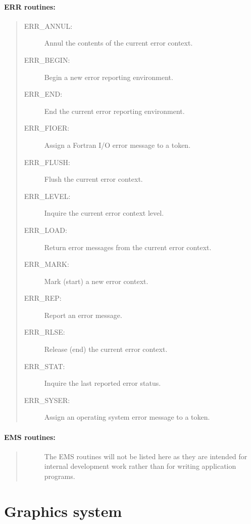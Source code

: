 \paragraph{ERR routines:}

\begin{quote}
\begin{description}
\item [ERR\_ANNUL:]  Annul the contents of the current error context.
\item [ERR\_BEGIN:]  Begin a new error reporting environment.
\item [ERR\_END:]  End the current error reporting environment.
\item [ERR\_FIOER:]  Assign a Fortran I/O error message to a token.
\item [ERR\_FLUSH:]  Flush the current error context.
\item [ERR\_LEVEL:]  Inquire the current error context level.
\item [ERR\_LOAD:]  Return error messages from the current error context.
\item [ERR\_MARK:]  Mark (start) a new error context.
\item [ERR\_REP:]  Report an error message.
\item [ERR\_RLSE:]  Release (end) the current error context.
\item [ERR\_STAT:]  Inquire the last reported error status.
\item [ERR\_SYSER:]  Assign an operating system error message to a token.
\end{description}
\end{quote}

\vspace*{10mm}

\paragraph{EMS routines:}\hfill

\begin{quote}
\begin{description}
\item [] The EMS routines will not be listed here as they are intended for
internal development work rather than for writing application programs.
\end{description}
\end{quote}

\newpage

\section{Graphics system}

